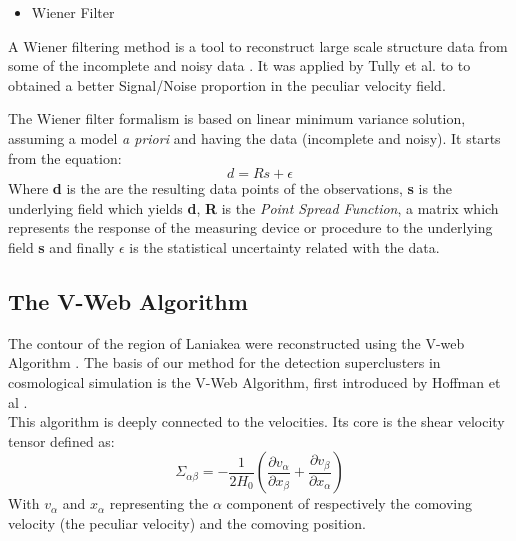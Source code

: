 \documentclass[12pt]{article}
\begin{document}
\begin{itemize}
\item Wiener Filter
\end{itemize}

\begin{par}
A Wiener filtering method is a tool to reconstruct
 large scale structure data from some of the incomplete
  and noisy data \cite{zaroubi_wiener_1995}. It  was
   applied by Tully et al. \cite{tully_laniakea_2014}
    to  to obtained a better Signal/Noise proportion in
     the peculiar velocity field.  \\
\end{par}

\begin{par}
The Wiener filter formalism is based on linear minimum
 variance solution, assuming a model \textit{a priori}
  and having the data (incomplete and noisy). It starts
   from the equation: 
  \[
  d = R s + \epsilon
  \]
  Where \textbf{d} is the are the resulting data
   points of the observations,  \textbf{s} is the
    underlying field which yields \textbf{d},
     \textbf{R} is the \textit{Point Spread
      Function}, a matrix which represents the response
       of the measuring device or procedure to the
        underlying field \textbf{s} and finally
         \textbf{ $\epsilon$ } is the statistical
          uncertainty related with the data.\\
\end{par}


\subsection{The V-Web Algorithm}
\label{sec:v_web}
The contour of the region of Laniakea were reconstructed
 using the V-web Algorithm \cite{tully_laniakea_2014}.
  The basis of our method for the
  detection superclusters in cosmological simulation is
   the V-Web Algorithm, first introduced by Hoffman et al \cite{hoffman_kinematic_2012}.\\

This algorithm is deeply
  connected to the velocities. Its core is the
   shear velocity tensor  defined as:\\
$$
\Sigma _{\alpha\beta} = -\frac{1}{2 H_0} \left( \frac{\partial v_{\alpha}}{\partial x_{\beta}} + \frac{\partial v_{\beta}}{\partial x_{\alpha}} \right)
$$
With $v_{\alpha}$ and $x_{\alpha}$ representing the $\alpha$ component of respectively the comoving velocity (the peculiar velocity) and the comoving position.  \\
\end{document}
